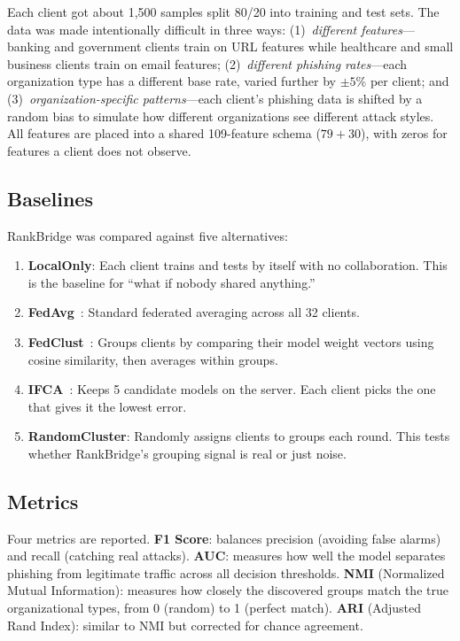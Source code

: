 \documentclass[information,article,submit,pdftex]{mdpi}
\begin{document}
Each client got about 1{,}500 samples split 80/20 into training and test sets.
The data was made intentionally difficult in three ways: (1)~\textit{different
features}---banking and government clients train on URL features while healthcare
and small business clients train on email features; (2)~\textit{different phishing
rates}---each organization type has a different base rate, varied further by
$\pm5$\% per client; and (3)~\textit{organization-specific patterns}---each
client's phishing data is shifted by a random bias to simulate how different
organizations see different attack styles. All features are placed into a shared
109-feature schema ($79 + 30$), with zeros for features a client does not observe.

\subsection{Baselines}

RankBridge was compared against five alternatives:

\begin{enumerate}[leftmargin=*]
  \item \textbf{LocalOnly}: Each client trains and tests by itself with no
    collaboration. This is the baseline for ``what if nobody shared anything.''
  \item \textbf{FedAvg}~\cite{mcmahan2017communication}: Standard federated
    averaging across all 32 clients.
  \item \textbf{FedClust}~\cite{sattler2021cfl}: Groups clients by comparing
    their model weight vectors using cosine similarity, then averages within
    groups.
  \item \textbf{IFCA}~\cite{ghosh2020ifca}: Keeps 5 candidate models on the
    server. Each client picks the one that gives it the lowest error.
  \item \textbf{RandomCluster}: Randomly assigns clients to groups each round.
    This tests whether RankBridge's grouping signal is real or just noise.
\end{enumerate}

\subsection{Metrics}

Four metrics are reported. \textbf{F1 Score}: balances precision (avoiding false
alarms) and recall (catching real attacks). \textbf{AUC}: measures how well the
model separates phishing from legitimate traffic across all decision thresholds.
\textbf{NMI} (Normalized Mutual Information): measures how closely the discovered
groups match the true organizational types, from 0 (random) to 1 (perfect match).
\textbf{ARI} (Adjusted Rand Index): similar to NMI but corrected for chance
agreement.
\end{document}

